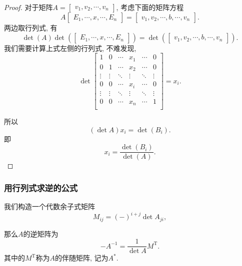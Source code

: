 \begin{proof}
    对于矩阵$A = \begin{bmatrix} v_1, v_2, \cdots, v_n \end{bmatrix}$, 考虑下面的矩阵方程
    \begin{equation}
      A \begin{bmatrix} E_1,  \cdots, x, \cdots,  E_n \end{bmatrix} = \begin{bmatrix} v_1, v_2, \cdots, b, \cdots, v_n \end{bmatrix}.
    \end{equation}
    两边取行列式, 有
    \begin{equation}
      \det \left( A \right) \det \left( \begin{bmatrix} E_1,  \cdots, x, \cdots,  E_n \end{bmatrix} \right) = \det \left( \begin{bmatrix} v_1, v_2, \cdots, b, \cdots, v_n \end{bmatrix} \right).
    \end{equation}
    我们需要计算上式左侧的行列式, 不难发现,
    \begin{equation}
      \det
      \begin{bmatrix}
         1 & 0 & \cdots & x_1 & \cdots & 0\\
            0 & 1 & \cdots & x_2 & \cdots & 0\\
            \vdots & \vdots & \ddots & \vdots & \ddots & \vdots\\
            0 & 0 & \cdots & x_i & \cdots & 0\\
            \vdots & \vdots & \ddots & \vdots & \ddots & \vdots\\
            0 & 0 & \cdots & x_n & \cdots & 1\\
      \end{bmatrix} = x_i.
    \end{equation}
    
    所以
    \begin{equation}
        \left( \det A \right) x_i = \det \left( B_i \right).
    \end{equation}
    即
    \begin{equation}
      x_i = \frac{\det \left( B_i \right)}{\det \left( A \right)}.
    \end{equation}
\end{proof}

\subsubsection{用行列式求逆的公式}
\begin{theorem}
    我们构造一个代数余子式矩阵
    \begin{equation}
        M_{ij} = \left( - \right) ^{i + j} \det A_{ji},
    \end{equation}
    
    那么$A$的逆矩阵为
    \begin{equation}
        -A^{-1} = \frac{1}{\det A} M^{\mathrm{T}}.
    \end{equation}
    其中的$M^{\mathrm{T}}$称为$A$的伴随矩阵, 记为$A^{*}$.
\end{theorem}


